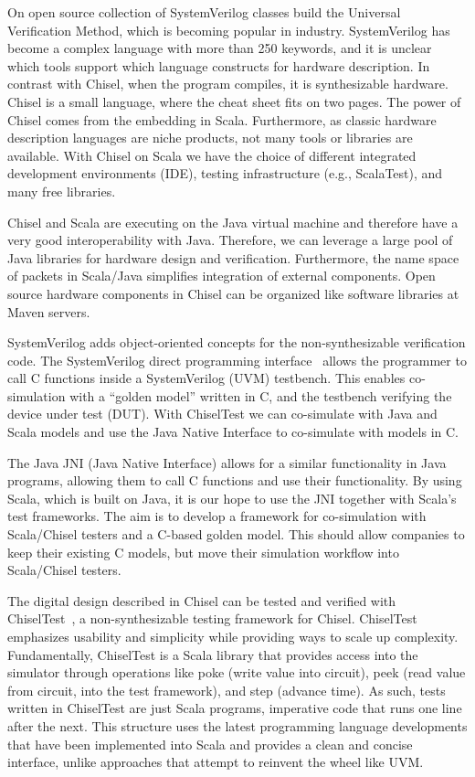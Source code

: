 \documentclass[conference]{IEEEtran}
\begin{document}
On open source collection of SystemVerilog classes build the Universal Verification Method,
which is becoming popular in industry.
SystemVerilog has become a complex language with more than 250 keywords, and it is unclear
which tools support which language constructs for hardware description.
In contrast with Chisel, when the program compiles, it is synthesizable hardware.
Chisel is a small language, where the cheat sheet fits on two pages.
The power of Chisel comes from the embedding in Scala.
Furthermore, as classic hardware description languages are niche products, not
many tools or libraries are available. 
With Chisel on Scala we have the choice of different integrated development environments (IDE),
testing infrastructure (e.g., ScalaTest), and many free libraries.



Chisel and Scala are executing on the Java virtual machine and therefore have a very good
interoperability with Java. Therefore, we can leverage a large pool of Java libraries for
hardware design and  verification.
Furthermore, the name space of packets in Scala/Java simplifies integration of
external components.
Open source hardware components in Chisel can be organized like software
libraries at Maven servers.






SystemVerilog adds object-oriented concepts for the non-synthesizable verification code.
The SystemVerilog direct programming interface~\cite{Doulos:SV:dpi} allows the programmer to call
C functions inside a SystemVerilog (UVM) testbench.
This enables co-simulation with a ``golden model'' written in C, and the
testbench verifying the device under test (DUT).
With ChiselTest we can co-simulate with Java and Scala models and use the Java Native Interface
to co-simulate with models in C.

The Java JNI (Java Native Interface) allows for a similar functionality in Java programs,
allowing them to call C functions and use their functionality.
By using Scala, which is built on Java, it is our hope to use the JNI together with Scala's test frameworks.
The aim is to develop a framework for co-simulation with Scala/Chisel testers and a
C-based golden model. This should allow companies to keep their existing C models,
but move their simulation workflow into Scala/Chisel testers.

The digital design described in Chisel can be tested and verified with
ChiselTest~\cite{chisel:tester2}, a non-synthesizable testing framework for Chisel.
ChiselTest emphasizes usability and simplicity while providing ways to scale up complexity.
Fundamentally, ChiselTest is a Scala library that provides access into the simulator through
operations like poke (write value into circuit), peek (read value from circuit, into the test framework), and step (advance time).
As such, tests written in ChiselTest are just Scala programs, imperative code that runs one line after the next.
This structure uses the latest programming language developments that have been implemented into Scala
and provides a clean and concise interface, unlike approaches that attempt to reinvent the wheel like UVM.
\end{document}
